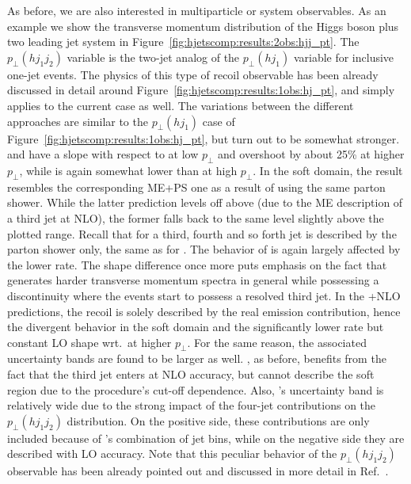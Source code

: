 As before, we are also interested in multiparticle or system
observables. As an example we show the transverse momentum
distribution of the Higgs boson plus two leading jet system in
Figure~\ref{fig:hjetscomp:results:2obs:hjj_pt}. The $p_\perp(hj_1j_2)$
variable is the two-jet analog of the $p_\perp(hj_1)$ variable for
inclusive one-jet events. The physics of this type of recoil
observable has been already discussed in detail around
Figure~\ref{fig:hjetscomp:results:1obs:hj_pt}, and simply applies to
the current case as well. The variations between the different
approaches are similar to the $p_\perp(hj_1)$ case of
Figure~\ref{fig:hjetscomp:results:1obs:hj_pt}, but turn out
to be somewhat stronger. \MGaMC and \Sherpa have a slope with respect
to \Powheg at low $p_\perp$ and overshoot by about 25\% at higher
$p_\perp$, while \Herwig is again somewhat lower than \Powheg at high
$p_\perp$. In the soft domain, the \Sherpa \NNLOPS result resembles
the corresponding ME+PS one as a result of using the same parton
shower. While the latter prediction levels off above \Powheg (due to
the ME description of a third jet at NLO), the former falls back to
the same level slightly above the plotted range. Recall that for 
\Sherpa \NNLOPS a third, fourth and so
forth jet is described by the parton shower only, the same as for \Powheg.
The behavior of \Hej is again largely affected by the lower rate. The
shape difference once more puts emphasis on the fact that \Hej
generates harder transverse momentum spectra in general while possessing 
a discontinuity where the events start to possess a resolved third jet. 
In the \GoSam{}+\Sherpa NLO predictions, the recoil is solely
described by the real emission contribution, hence the divergent
behavior in the soft domain and the significantly lower rate but
constant LO shape wrt.~\Powheg at higher $p_\perp$. For the same
reason, the associated uncertainty bands are found to be larger as
well. \Loopsim, as before, benefits from the fact that the third
jet enters at NLO accuracy, but cannot describe the soft region due to
the procedure's cut-off dependence. Also, \Loopsim's uncertainty band
is relatively wide due to the strong impact of the four-jet
contributions on the $p_\perp(hj_1j_2)$ distribution. On the positive
side, these contributions are only included because of \Loopsim's
combination of jet bins, while on the negative side they are described
with  LO accuracy. Note that this peculiar behavior of the
$p_\perp(hj_1j_2)$ observable has been already pointed out and
discussed in more detail in Ref.~\cite{Greiner:2015jha}.

